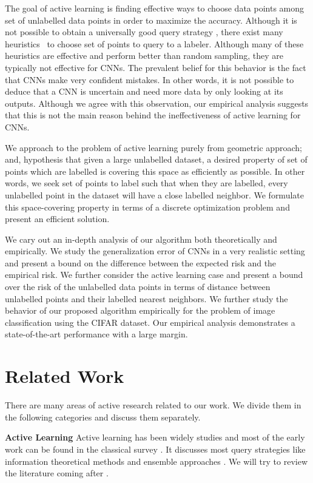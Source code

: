 \documentclass{article}
\begin{document}
The goal of active learning is finding effective ways to choose data points among set of unlabelled data points in order to maximize the accuracy. Although it is not possible to obtain a universally good query strategy \cite{dasgupta}, there exist many heuristics~\cite{settles2010active} to choose set of points to query to a labeler. Although many of these heuristics are effective and perform better than random sampling, they are typically not effective for CNNs. The prevalent belief for this behavior is the fact that CNNs make very confident mistakes. In other words, it is not possible to deduce that a CNN is uncertain and need more data by only looking at its outputs. Although we agree with this observation, our empirical analysis suggests that this is not the main reason behind the ineffectiveness of active learning for CNNs. 

We approach to the problem of active learning purely from geometric approach; and, hypothesis that given a large unlabelled dataset, a desired property of set of points which are labelled is covering this space as efficiently as possible. In other words, we seek set of points to label such that when they are labelled, every unlabelled point in the dataset will have a close labelled neighbor. We formulate this space-covering property in terms of a discrete optimization problem and present an efficient solution. 

We cary out an in-depth analysis of our algorithm both theoretically and empirically. We study the generalization error of CNNs in a very realistic setting and present a bound on the difference between the expected risk and the empirical risk. We further consider the active learning case and present a bound over the risk of the unlabelled data points in terms of distance between unlabelled points and their labelled nearest neighbors. We further study the behavior of our proposed algorithm empirically for the problem of image classification using the CIFAR\cite{cifar} dataset. Our empirical analysis demonstrates a state-of-the-art performance with a large margin. 

\section{Related Work}
There are many areas of active research related to our work. We divide them in the following categories and discuss them separately. 

\noindent\textbf{Active Learning}
Active learning has been widely studies and most of the early work can be found in the classical survey \cite{settles2010active}. It discusses most query strategies like information theoretical methods \cite{mackay1992information} and ensemble approaches \cite{mccallumzy1998employing, freund1997selective}. We will try to review the literature coming after \cite{settles2010active}. 
\end{document}
